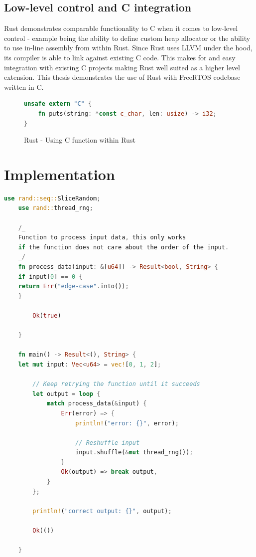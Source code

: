 \documentclass[12pt, letterpaper]{article}
\begin{document}
\subsection{Low-level control and C integration}
Rust demonstrates comparable functionality to C when it comes to low-level control - example being the ability to define custom heap allocator or the ability to use in-line assembly from within Rust. Since Rust uses LLVM under the hood, its compiler is able to link against existing C code. This makes for and easy integration with existing C projects making Rust well suited as a higher level extension. This thesis demonstrates the use of Rust with FreeRTOS codebase written in C.

\begin{figure}
\begin{lstlisting}[language=Rust]
unsafe extern "C" {
    fn puts(string: *const c_char, len: usize) -> i32;
}
\end{lstlisting}
\caption{Rust - Using C function within Rust}
\label{fig:rust_extern}
\end{figure}

\newpage

\section{Implementation}



\begin{lstlisting}[language=Rust]
    use rand::seq::SliceRandom;
    use rand::thread_rng;
    
    /_
    Function to process input data, this only works
    if the function does not care about the order of the input.
    _/
    fn process_data(input: &[u64]) -> Result<bool, String> {
    if input[0] == 0 {
    return Err("edge-case".into());
    }
    
        Ok(true)
    
    }
    
    fn main() -> Result<(), String> {
    let mut input: Vec<u64> = vec![0, 1, 2];
    
        // Keep retrying the function until it succeeds
        let output = loop {
            match process_data(&input) {
                Err(error) => {
                    println!("error: {}", error);
    
                    // Reshuffle input
                    input.shuffle(&mut thread_rng());
                }
                Ok(output) => break output,
            }
        };
    
        println!("correct output: {}", output);
    
        Ok(())
    
    }
    \end{lstlisting}
\end{document}
